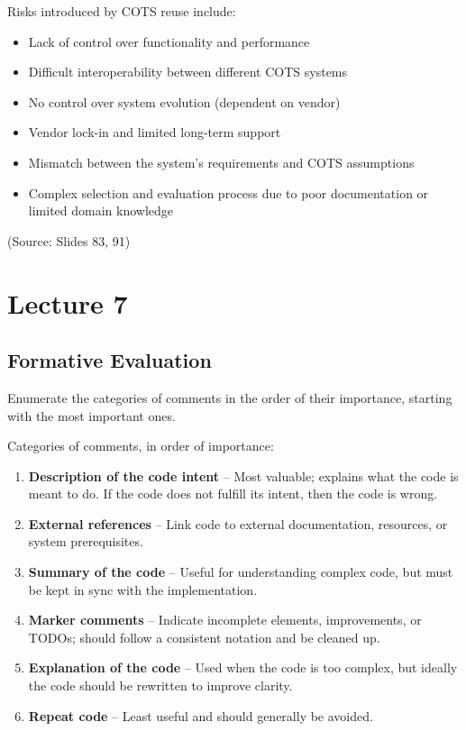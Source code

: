 \documentclass[12pt]{article}
\begin{document}
Risks introduced by COTS reuse include:
\begin{itemize}
    \item Lack of control over functionality and performance
    \item Difficult interoperability between different COTS systems
    \item No control over system evolution (dependent on vendor)
    \item Vendor lock-in and limited long-term support
    \item Mismatch between the system's requirements and COTS assumptions
    \item Complex selection and evaluation process due to poor documentation or limited domain knowledge
\end{itemize}

(Source: Slides 83, 91)
\newpage
\section{Lecture 7}

\subsection{Formative Evaluation}

\begin{questionbox}
Enumerate the categories of comments in the order of their importance, starting with the most important ones.
\end{questionbox}

Categories of comments, in order of importance:
\begin{enumerate}
    \item \textbf{Description of the code intent} -- Most valuable; explains what the code is meant to do. If the code does not fulfill its intent, then the code is wrong.
    \item \textbf{External references} -- Link code to external documentation, resources, or system prerequisites.
    \item \textbf{Summary of the code} -- Useful for understanding complex code, but must be kept in sync with the implementation.
    \item \textbf{Marker comments} -- Indicate incomplete elements, improvements, or TODOs; should follow a consistent notation and be cleaned up.
    \item \textbf{Explanation of the code} -- Used when the code is too complex, but ideally the code should be rewritten to improve clarity.
    \item \textbf{Repeat code} -- Least useful and should generally be avoided.
\end{enumerate}
\end{document}
